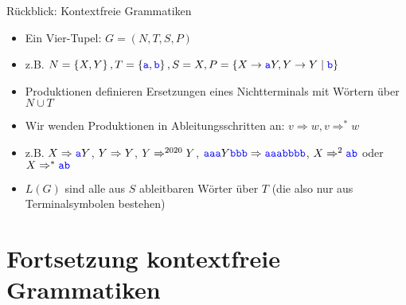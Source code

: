 

\begin{frame}{Rückblick: Kontextfreie Grammatiken}
	\begin{itemize}[<+->]
		\item Ein Vier-Tupel: $G = (N, T, S, P)$
		\item[] z.B. $N=\left\{X,Y\right\}, T=\left\{\hbox{\textcolor{blue}{\texttt{a}}}, \hbox{\textcolor{blue}{\texttt{b}}}\right\}, S=X, P=\left\{X \to \hbox{\textcolor{blue}{\texttt{a}}} Y, Y \to Y \mid \hbox{\textcolor{blue}{\texttt{b}}} \right\}$
		\item Produktionen definieren Ersetzungen eines Nichtterminals mit Wörtern über $N \cup T$
		\item Wir wenden Produktionen in Ableitungsschritten an: $v \Rightarrow w, v \Rightarrow^* w$
		\item[] z.B. $X \Rightarrow \hbox{\textcolor{blue}{\texttt{a}}} Y$, $Y \Rightarrow Y$, $Y \Rightarrow^{2020} Y$, $\hbox{\textcolor{blue}{\texttt{aaa}}}Y\hbox{\textcolor{blue}{\texttt{bbb}}} \Rightarrow \hbox{\textcolor{blue}{\texttt{aaabbbb}}}$, $X \Rightarrow^2 \hbox{\textcolor{blue}{\texttt{ab}}}$ oder $X \Rightarrow^\ast \hbox{\textcolor{blue}{\texttt{ab}}}$
		\item $L(G)$ sind alle aus $S$ ableitbaren Wörter über $T$ (die also nur aus Terminalsymbolen bestehen)
	\end{itemize}
\end{frame}

\section{Fortsetzung kontextfreie Grammatiken}

